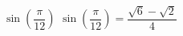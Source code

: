{\label{sinpi12} $\sin \left( \dfrac{\pi}{12} \right)$ }
{$\sin \left( \dfrac{\pi}{12} \right) = \dfrac{\sqrt{6} - \sqrt{2}}{4}$}
